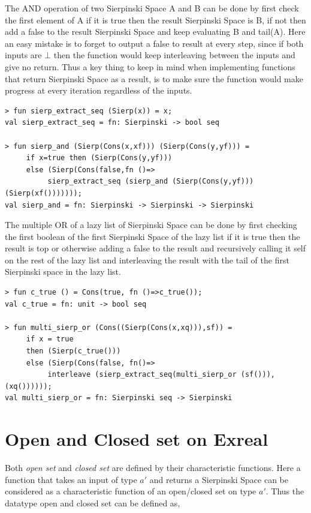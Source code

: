 \documentclass[12pt,twoside,notitlepage]{report}
\begin{document}
The AND operation of two Sierpinski Space A and B can be done by first check the first element of A if it is true then the result Sierpinski Space is B, if not then add a false to the result Sierpinski Space and keep evaluating B and tail(A). Here an easy mistake is to forget to output a false to result at every step, since if both inputs are $\bot$ then the function would keep interleaving between the inputs and give no return. Thus a key thing to keep in mind when implementing functions that return Sierpinski Space as a result, is to make sure the function would make progress at every iteration regardless of the inputs.

{
\begin{verbatim}
> fun sierp_extract_seq (Sierp(x)) = x;
val sierp_extract_seq = fn: Sierpinski -> bool seq

> fun sierp_and (Sierp(Cons(x,xf))) (Sierp(Cons(y,yf))) = 
     if x=true then (Sierp(Cons(y,yf)))
     else (Sierp(Cons(false,fn ()=> 
          sierp_extract_seq (sierp_and (Sierp(Cons(y,yf))) (Sierp(xf()))))));
val sierp_and = fn: Sierpinski -> Sierpinski -> Sierpinski
\end{verbatim}
}
 
The multiple OR of a lazy list of Sierpinski Space can be done by first checking the first boolean of the first Sierpinski Space of the lazy list if it is true then the result is top or otherwise adding a false to the result and recursively calling it self on the rest of the lazy list and interleaving the result with the tail of the first Sierpinski space in the lazy list. 

{
\begin{verbatim}
> fun c_true () = Cons(true, fn ()=>c_true());
val c_true = fn: unit -> bool seq

> fun multi_sierp_or (Cons((Sierp(Cons(x,xq))),sf)) = 
     if x = true
     then (Sierp(c_true()))
     else (Sierp(Cons(false, fn()=>
          interleave (sierp_extract_seq(multi_sierp_or (sf())),(xq())))));
val multi_sierp_or = fn: Sierpinski seq -> Sierpinski
\end{verbatim}
}





\section{Open and Closed set on Exreal}

Both \emph{open set} and \emph{closed set} are defined by their characteristic functions. Here a function that takes an input of type $a'$ and returns a Sierpinski Space can be considered as a characteristic function of an open/closed set on type $a'$.
Thus the datatype open and closed set can be defined as,
\end{document}
